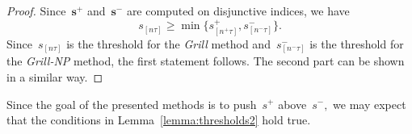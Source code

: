 \documentclass[11pt,a4paper]{article}
\theoremstyle{definition}
\newcommand{\grill}{\textit{Grill}\xspace}
\newcommand{\grillnp}{\textit{Grill-NP}\xspace}
\begin{document}
\begin{proof}
  Since~$\bm{s}^+$ and~$\bm{s}^-$ are computed on disjunctive indices, we have
  \begin{equation*}
    s_{[n\tau]} \ge \min\{s_{[n^+\tau]}^+, s_{[n^-\tau]}^-\}.
  \end{equation*}
  Since~$s_{[n\tau]}$ is the threshold for the \grill method and~$s_{[n^-\tau]}^-$ is the threshold for the \grillnp method, the first statement follows. The second part can be shown in a similar way.
\end{proof}

\noindent Since the goal of the presented methods is to push~$s^+$ above~$s^-,$ we may expect that the conditions in Lemma~\ref{lemma:thresholds2} hold true. 

\clearpage
{}


\end{document}

